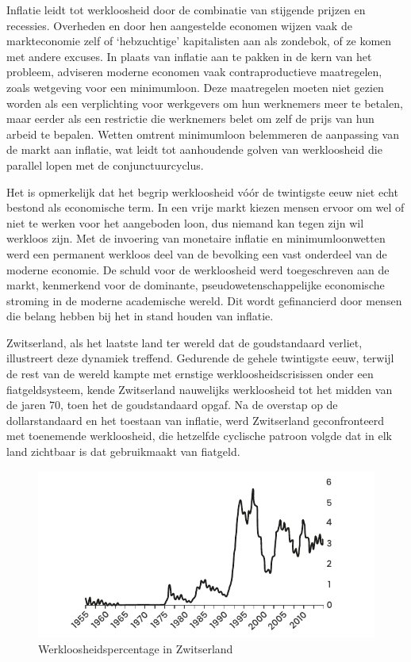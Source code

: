 Inflatie leidt tot werkloosheid door de combinatie van stijgende prijzen en recessies. Overheden en door hen aangestelde economen wijzen vaak de markteconomie zelf of `hebzuchtige' kapitalisten aan als zondebok, of ze komen met andere excuses. In plaats van inflatie aan te pakken in de kern van het probleem, adviseren moderne economen vaak contraproductieve maatregelen, zoals wetgeving voor een minimumloon. Deze maatregelen moeten niet gezien worden als een verplichting voor werkgevers om hun werknemers meer te betalen, maar eerder als een restrictie die werknemers belet om zelf de prijs van hun arbeid te bepalen. Wetten omtrent minimumloon belemmeren de aanpassing van de markt aan inflatie, wat leidt tot aanhoudende golven van werkloosheid die parallel lopen met de conjunctuurcyclus.

Het is opmerkelijk dat het begrip werkloosheid vóór de twintigste eeuw
niet echt bestond als economische term. In een vrije markt kiezen mensen
ervoor om wel of niet te werken voor het aangeboden loon, dus niemand
kan tegen zijn wil werkloos zijn. Met de invoering van monetaire
inflatie en minimumloonwetten werd een permanent werkloos deel van de
bevolking een vast onderdeel van de moderne economie. De schuld voor de
werkloosheid werd toegeschreven aan de markt, kenmerkend voor de
dominante, pseudowetenschappelijke economische stroming in de moderne
academische wereld. Dit wordt gefinancierd door mensen die belang hebben
bij het in stand houden van inflatie.

Zwitserland, als het laatste land ter wereld dat de goudstandaard verliet, illustreert deze dynamiek treffend. Gedurende de gehele twintigste eeuw, terwijl de rest van de wereld kampte met ernstige werkloosheidscrisissen onder een fiatgeldsysteem, kende Zwitserland nauwelijks werkloosheid tot het midden van de jaren 70, toen het de goudstandaard opgaf.\autocite{42} Na de overstap op de dollarstandaard en het toestaan van inflatie, werd Zwitserland geconfronteerd met toenemende werkloosheid, die hetzelfde cyclische patroon volgde dat in elk land zichtbaar is dat gebruikmaakt van fiatgeld.

\begin{figure}[!htb]
\centering
    \includegraphics[width=\textwidth]{figures/fig7.pdf}
\caption[Werkloosheidspercentage in Zwitserland]{Werkloosheidspercentage in Zwitserland}
\label{fig7}
\end{figure}

